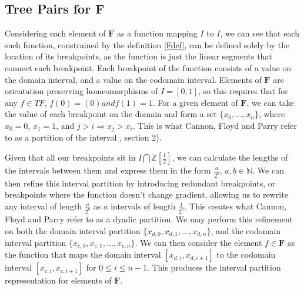 \documentclass[
11pt, %
english, %
singlespacing, %
parskip, %
headsepline, %
]{amsart} %
\theoremstyle{definition}
\newcommand{\TF}{\textbf{F}}
\begin{document}
\subsection{Tree Pairs for \TF}\label{treepair}

Considering each element of $\TF$ as a function mapping $I$ to $I$, we can see that each such function, constrained by the definition \ref{Fdef}, can be defined solely by the location of its breakpoints, as the function is just the linear segments that connect each breakpoint. Each breakpoint of the function consists of a value on the domain interval, and a value on the codomain interval. Elements of $\TF$ are orientation preserving homeomorphisms of $I = [0,1]$, so this requires that for any $f \in TF$, $f(0) = (0) and f(1) = 1$. For a given element of $\TF$, we can take the value of each breakpoint on the domain and form a set $\{x_0,\dots,x_n\}$, where $x_0 = 0$, $x_1 = 1$, and $j>i \Rightarrow x_j > x_i$. This is what Cannon, Floyd and Parry refer to as a partition of the interval \cite{CFP}, section 2).

Given that all our breakpoints sit in $I \bigcap \mathbb{Z}[\frac{1}{2}]$, we can calculate the lengths of the intervals between them and express them in the form $\frac{a}{2^b}$, $a, b \in \mathbb{N}$. We can then refine this interval partition by introducing redundant breakpoints, or breakpoints where the function doesn't change gradient, allowing us to rewrite any interval of length $\frac{a}{2^b}$ as $a$ intervals of length $\frac{1}{2^b}$. This creates what Cannon, Floyd and Parry refer to as a dyadic partition. We may perform this refinement on both the domain interval partition $\{x_{d,0}, x_{d,1}, \dots, x_{d,n}\}$, and the codomain interval partition $\{x_{c,0}, x_{c,1}, \dots, x_{c,n}\}$. We can then consider the element $f \in \TF$ as the function that maps the domain interval $[x_{d,i}, x_{d,i+1}]$ to the codomain interval $[x_{c,i}, x_{c,i+1}]$ for $0 \leq i \leq n-1$. This produces the interval partition representation for elements of $\TF$.
\end{document}
